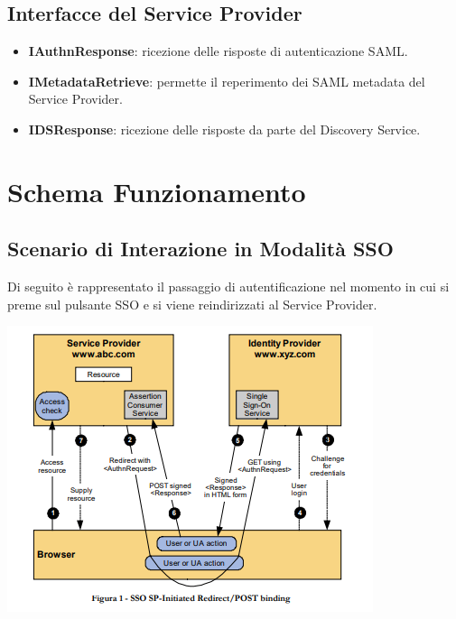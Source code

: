 \subsection{Interfacce del Service Provider}
\begin{itemize}
    \item \textbf{IAuthnResponse}: ricezione delle risposte di autenticazione SAML.
    \item \textbf{IMetadataRetrieve}: permette il reperimento dei SAML metadata del Service Provider.
    \item \textbf{IDSResponse}: ricezione delle risposte da parte del Discovery Service.
\end{itemize}

\pagebreak
\section{Schema Funzionamento}
\subsection{Scenario di Interazione in Modalità SSO}
Di seguito è rappresentato il passaggio di autentificazione nel momento in cui si preme sul pulsante SSO e si viene reindirizzati al Service Provider.
\begin{center}
	\includegraphics[scale = 1]{./res/images/ScenarioUsoSPIDSchema.PNG}
\end{center}

